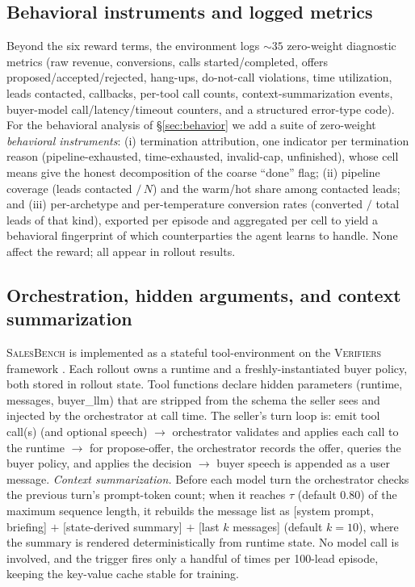 \documentclass{article} %
\newcommand{\salesbench}{\textsc{SalesBench}}
\begin{document}
\subsection{Behavioral instruments and logged metrics}
\label{app:metrics}
Beyond the six reward terms, the environment logs ${\sim}35$ zero-weight diagnostic metrics (raw revenue, conversions,
calls started/completed, offers proposed/accepted/rejected, hang-ups, do-not-call violations, time utilization, leads
contacted, callbacks, per-tool call counts, context-summarization events, buyer-model call/latency/timeout counters, and
a structured error-type code). For the behavioral analysis of \S\ref{sec:behavior} we add a suite of zero-weight
\emph{behavioral instruments}: (i) termination attribution, one indicator per termination reason (pipeline-exhausted,
time-exhausted, invalid-cap, unfinished), whose cell means give the honest decomposition of the coarse ``done'' flag;
(ii) pipeline coverage (leads contacted $/\,N$) and the warm/hot share among contacted leads; and (iii) per-archetype and
per-temperature conversion rates (converted $/$ total leads of that kind), exported per episode and aggregated per cell to
yield a behavioral fingerprint of which counterparties the agent learns to handle. None affect the reward; all appear in
rollout results.

\subsection{Orchestration, hidden arguments, and context summarization}
\label{app:context}
\salesbench{} is implemented as a stateful tool-environment on the \textsc{Verifiers} framework
\citep{brown2025verifiers}. Each rollout owns a runtime and a freshly-instantiated buyer policy, both stored in rollout
state. Tool functions declare hidden parameters (runtime, messages, buyer\_llm) that are stripped from the schema the
seller sees and injected by the orchestrator at call time. The seller's turn loop is: emit tool call(s) (and optional
speech) $\rightarrow$ orchestrator validates and applies each call to the runtime $\rightarrow$ for propose-offer, the
orchestrator records the offer, queries the buyer policy, and applies the decision $\rightarrow$ buyer speech is appended
as a user message. \emph{Context summarization.} Before each model turn the orchestrator checks the previous turn's
prompt-token count; when it reaches $\tau$ (default $0.80$) of the maximum sequence length, it rebuilds the message list as
[system prompt, briefing] $+$ [state-derived summary] $+$ [last $k$ messages] (default $k{=}10$), where the summary is
rendered deterministically from runtime state. No model call is involved, and the trigger fires only a handful of times per
100-lead episode, keeping the key-value cache stable for training.
\end{document}

